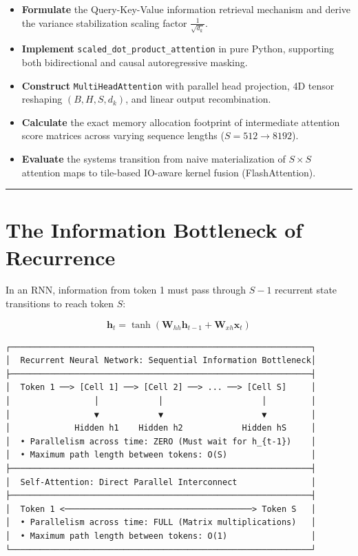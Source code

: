 \documentclass[
  letterpaper,
]{scrbook}
\providecommand{\tightlist}{%
  \setlength{\itemsep}{0pt}\setlength{\parskip}{0pt}}
\begin{document}
\begin{itemize}
\tightlist
\item
  \textbf{Formulate} the Query-Key-Value information retrieval mechanism
  and derive the variance stabilization scaling factor
  \(\frac{1}{\sqrt{d_k}}\).
\item
  \textbf{Implement} \texttt{scaled\_dot\_product\_attention} in pure
  Python, supporting both bidirectional and causal autoregressive
  masking.
\item
  \textbf{Construct} \texttt{MultiHeadAttention} with parallel head
  projection, 4D tensor reshaping \((B, H, S, d_k)\), and linear output
  recombination.
\item
  \textbf{Calculate} the exact memory allocation footprint of
  intermediate attention score matrices across varying sequence lengths
  (\(S = 512 \to 8192\)).
\item
  \textbf{Evaluate} the systems transition from naive materialization of
  \(S \times S\) attention maps to tile-based IO-aware kernel fusion
  (FlashAttention).
\end{itemize}

\begin{center}\rule{0.5\linewidth}{0.5pt}\end{center}

\section{The Information Bottleneck of
Recurrence}\label{the-information-bottleneck-of-recurrence}

In an RNN, information from token 1 must pass through \(S-1\) recurrent
state transitions to reach token \(S\):

\[\mathbf{h}_t = \tanh(\mathbf{W}_{hh} \mathbf{h}_{t-1} + \mathbf{W}_{xh} \mathbf{x}_t)\]

\begin{verbatim}
┌─────────────────────────────────────────────────────────────┐
│  Recurrent Neural Network: Sequential Information Bottleneck│
├─────────────────────────────────────────────────────────────┤
│  Token 1 ──> [Cell 1] ──> [Cell 2] ──> ... ──> [Cell S]     │
│                 │            │                    │         │
│                 ▼            ▼                    ▼         │
│             Hidden h1    Hidden h2            Hidden hS     │
│  • Parallelism across time: ZERO (Must wait for h_{t-1})    │
│  • Maximum path length between tokens: O(S)                 │
├─────────────────────────────────────────────────────────────┤
│  Self-Attention: Direct Parallel Interconnect               │
├─────────────────────────────────────────────────────────────┤
│  Token 1 <──────────────────────────────────────> Token S   │
│  • Parallelism across time: FULL (Matrix multiplications)   │
│  • Maximum path length between tokens: O(1)                 │
└─────────────────────────────────────────────────────────────┘
\end{verbatim}
\end{document}
